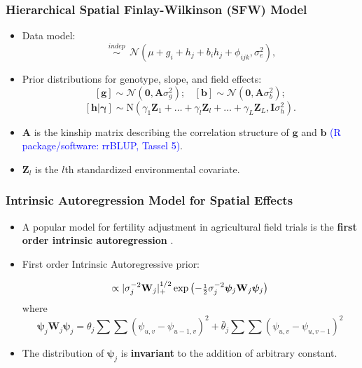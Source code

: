 \documentclass{beamer}
\newcommand{\bA}{\mathbf{A}}
\newcommand{\bphi}{{\bm\phi}}
\newcommand{\bpsi}{{\bm\psi}}
\newcommand{\bW}{\mathbf{W}}
\newcommand{\bZ}{\mathbf{Z}}
\newcommand{\shalf}{\mbox{{\footnotesize$\frac{1}{2}$}}}
\begin{document}
\begin{frame}
	\frametitle{Hierarchical Spatial Finlay-Wilkinson (SFW) Model}
	\begin{itemize}
	\item Data model:
\begin{equation*}
[y_{ijk} | \mu, \mathbf{g}, \mathbf{b}, \mathbf{h}, \bphi ] \ \ \overset{indep}{\sim} \ \  \mathcal{N}(\mu + g_i + h_j + b_i h_j + \phi_{ijk}, \sigma_e^2),
\end{equation*}

	\item Prior distributions for genotype, slope, and field effects:
	$$  [\mathbf{g}] \sim \mathcal{N}(\bm{0}, \bA \sigma_g^2); \ \ \ \ [\mathbf{b}] \sim \mathcal{N}(\bm{0}, \bA \sigma_b^2); $$
        $$[\mathbf{h}|\bm{\gamma}] \sim \mathrm{N}( \gamma_1 \bZ_1 + \dots + \gamma_l \bZ_l + \dots + \gamma_L \bZ_L
         , \mathbf{I} \sigma_h^2).$$
         \item $\bA$ is the kinship matrix describing the correlation structure of $\mathbf{g}$ and $\mathbf{b}$ \textcolor{blue}{(R package/software: rrBLUP, Tassel 5)}.
	\item $\bZ_{l}$ is the $l$th standardized environmental covariate.
	\end{itemize}
\end{frame}


\begin{frame}
	\frametitle{Intrinsic Autoregression Model for Spatial Effects}
	\begin{itemize}
	\item A popular model for fertility adjustment in agricultural field trials is the \textbf{first order intrinsic autoregression} \citep{besag1999bayesian,dutt:mond:2015}.

\item First order Intrinsic Autoregressive prior:

\begin{equation*}
[\bpsi_j|\theta_j,\sigma^2_j] \propto |\sigma^{-2}_j\bW_j|_+^{1/2}\exp\left( -\shalf\sigma^{-2}_j\bpsi_j\bW_j\bpsi_j\right)
\end{equation*}
where
\[\bpsi_j\bW_j\bpsi_j = \theta_j\sum\sum(\psi_{u,v} - \psi_{u-1,v})^2 + {\bar\theta}_j\sum\sum(\psi_{u,v} - \psi_{u,v-1})^2\]

\item  The distribution of $\pmb{\psi}_j$ is \textbf{invariant} to the addition of arbitrary constant.

	\end{itemize}

\end{frame}
\end{document}
